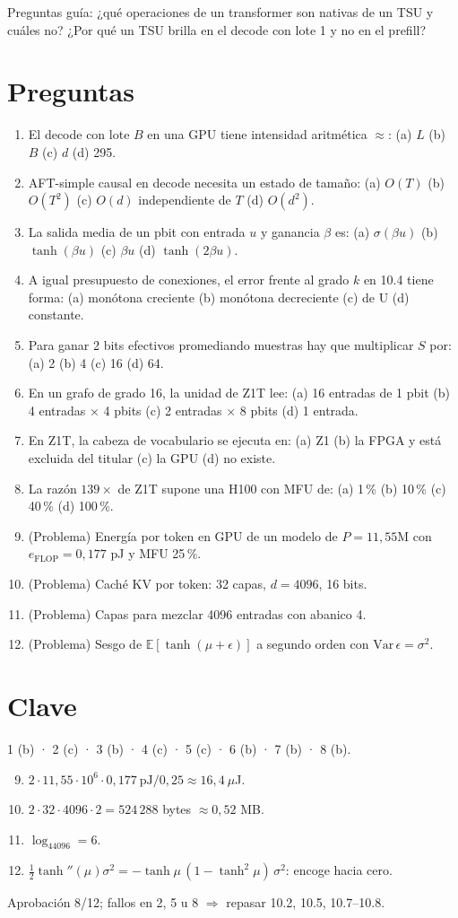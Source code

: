 \documentclass[11pt,a4paper]{article}
\begin{document}
\noindent Preguntas guía: ¿qué operaciones de un transformer son nativas de un TSU y cuáles no? ¿Por qué un TSU brilla en el decode con lote 1 y no en el prefill?
\section*{Preguntas}
\begin{enumerate}
\item El decode con lote $B$ en una GPU tiene intensidad aritmética $\approx$: (a) $L$ (b) $B$ (c) $d$ (d) 295.
\item AFT-simple causal en decode necesita un estado de tamaño: (a) $O(T)$ (b) $O(T^2)$ (c) $O(d)$ independiente de $T$ (d) $O(d^2)$.
\item La salida media de un pbit con entrada $u$ y ganancia $\beta$ es: (a) $\sigma(\beta u)$ (b) $\tanh(\beta u)$ (c) $\beta u$ (d) $\tanh(2\beta u)$.
\item A igual presupuesto de conexiones, el error frente al grado $k$ en 10.4 tiene forma: (a) monótona creciente (b) monótona decreciente (c) de U (d) constante.
\item Para ganar 2 bits efectivos promediando muestras hay que multiplicar $S$ por: (a) 2 (b) 4 (c) 16 (d) 64.
\item En un grafo de grado 16, la unidad de Z1T lee: (a) 16 entradas de 1 pbit (b) 4 entradas $\times$ 4 pbits (c) 2 entradas $\times$ 8 pbits (d) 1 entrada.
\item En Z1T, la cabeza de vocabulario se ejecuta en: (a) Z1 (b) la FPGA y está excluida del titular (c) la GPU (d) no existe.
\item La razón $139\times$ de Z1T supone una H100 con MFU de: (a) 1\,\% (b) 10\,\% (c) 40\,\% (d) 100\,\%.
\item (Problema) Energía por token en GPU de un modelo de $P=11{,}55$M con $e_{\text{FLOP}}=0{,}177$ pJ y MFU 25\,\%.
\item (Problema) Caché KV por token: 32 capas, $d=4096$, 16 bits.
\item (Problema) Capas para mezclar 4096 entradas con abanico 4.
\item (Problema) Sesgo de $\mathbb E[\tanh(\mu+\epsilon)]$ a segundo orden con $\mathrm{Var}\,\epsilon=\sigma^2$.
\end{enumerate}
\newpage
\section*{Clave}
1 (b) · 2 (c) · 3 (b) · 4 (c) · 5 (c) · 6 (b) · 7 (b) · 8 (b).
\begin{enumerate}\setcounter{enumi}{8}
\item $2\cdot11{,}55\cdot10^6\cdot0{,}177\ \text{pJ}/0{,}25\approx16{,}4\ \mu$J.
\item $2\cdot32\cdot4096\cdot2=524\,288$ bytes $\approx0{,}52$ MB.
\item $\log_44096=6$.
\item $\tfrac12\tanh''(\mu)\sigma^2=-\tanh\mu\,(1-\tanh^2\mu)\,\sigma^2$: encoge hacia cero.
\end{enumerate}
Aprobación 8/12; fallos en 2, 5 u 8 $\Rightarrow$ repasar 10.2, 10.5, 10.7--10.8.
\end{document}
